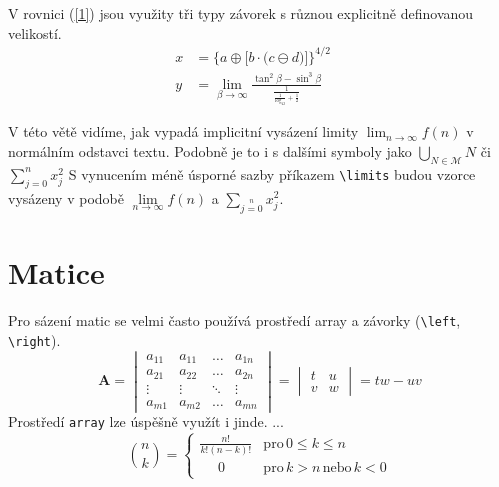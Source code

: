 \documentclass[a4paper,11pt]{article}
\theoremstyle{definition}
\begin{document}
V rovnici (\ref{1}) jsou využity tři typy závorek s různou explicitně definovanou velikostí.
\begin{align}
x &= \bigg\{ a \oplus \Big[ b \cdot \big( c \ominus d \big) \Big] \bigg\}^{4/2} \quad \label{1}\\
y &= \lim_{\beta \to \infty} \frac{\tan^2 \beta - \sin^3 \beta}{\frac{1}{\frac{1}{\log_{42}} + \frac{1}{2}}} \quad \label{2}
\end{align}

V této větě vidíme, jak vypadá implicitní vysázení limity $\lim_{n \to \infty} f(n)$ v normálním odstavci textu. Podobně je to i s dalšími symboly jako $\bigcup_{N \in \mathcal{M}}N$ či $ \sum_{j=0}^{n} x^2_j $ 
S vynucením méně úsporné sazby příkazem \verb|\limits| budou vzorce vysázeny v podobě $\lim\limits_{n \to \infty} f(n)$ a $\sum\limits_{j=0}\limits^{n} x^2_j$.


\section{Matice}

Pro sázení matic se velmi často používá prostředí array a závorky (\verb|\left|, \verb|\right|). 
$$
\mathbf{A} =
\begin{vmatrix}
        a_{11} & a_{11} & \ldots & a_{1n}\\ 
        a_{21} & a_{22} & \ldots & a_{2n}\\
        \vdots & \vdots & \ddots & \vdots\\
        a_{m1} & a_{m2} & \ldots & a_{mn}
\end{vmatrix}
=
\begin{vmatrix}
        t & u\\
        v & w
\end{vmatrix}
= tw - uv
$$
Prostředí \texttt{array} lze úspěšně využít i jinde.
...
$$
\binom{n}{k} =
\begin{cases}
    \frac{n!}{k!(n-k)!} &\text{pro}\, 0 \le k \le n \\
     \quad \, \,0 &\text{pro}\, k > n \,\text{nebo}\, k < 0
\end{cases}
$$
\end{document}
